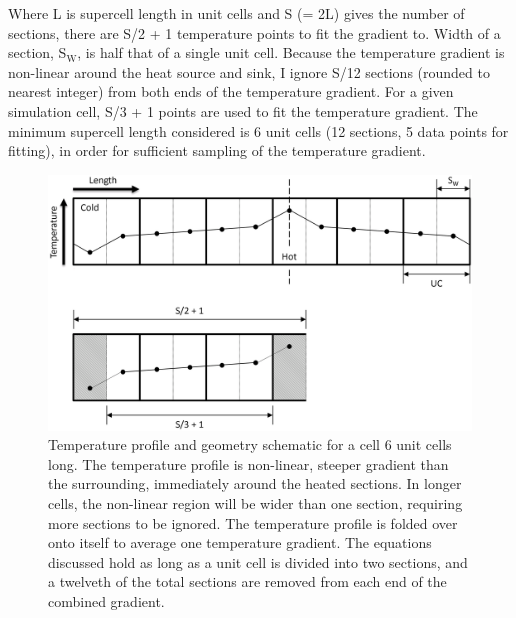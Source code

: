 Where L is supercell length in unit cells and S (= 2L) gives the number of sections, there are S/2 + 1 temperature points to fit the gradient to. Width of a section, S$_{\mathrm{W}}$, is half that of a single unit cell. Because the temperature gradient is non-linear around the heat source and sink, I ignore S/12 sections (rounded to nearest integer) from both ends of the temperature gradient. For a given simulation cell, S/3 + 1 points are used to fit the temperature gradient. The minimum supercell length considered is 6 unit cells (12 sections, 5 data points for fitting), in order for sufficient sampling of the temperature gradient. 



\begin{figure}[hp!]
\includegraphics[width=\linewidth]{Figures/direct_temp_pro_03.png}
\caption[direct temperature profile 3]{Temperature profile and geometry schematic for a cell 6 unit cells long. The temperature profile is non-linear, steeper gradient than the surrounding, immediately around the heated sections. In longer cells, the non-linear region will be wider than one section, requiring more sections to be ignored. The temperature profile is folded over onto itself to average one temperature gradient. The equations discussed hold as long as a unit cell is divided into two sections, and a twelveth of the total sections are removed from each end of the combined gradient.}
\label{fig:direct_temp_pro_03}
\end{figure}

